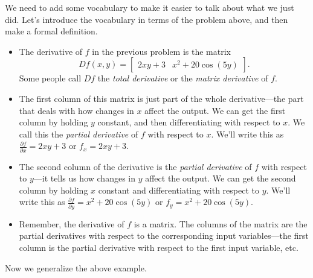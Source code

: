 We need to add some vocabulary to make it easier to talk about what we just did. Let's introduce the vocabulary in terms of the problem above, and then make a formal definition.
\begin{itemize}
 \item The derivative of $f$ in the previous problem is the matrix 
 $$Df(x,y) = \begin{bmatrix}
  2xy+3& 
  x^2+20\cos(5y)
 \end{bmatrix}.$$ 
 Some people call $Df$ the \emph{total derivative} or the \emph{matrix derivative} of $f$.
 \item The first column of this matrix is just part of the whole derivative---the part that deals with how changes in $x$ affect the output. We can get the first column by holding $y$ constant, and then differentiating with respect to $x$.  We call this the \emph{partial derivative} of $f$ with respect to $x$.  We'll write this as $\frac{\partial f}{\partial x} = 2xy+3$ or $f_x = 2xy+3$.
 \item The second column of the derivative is the \emph{partial derivative} of $f$ with respect to $y$---it tells us how changes in $y$ affect the output. We can get the second column by holding $x$ constant and differentiating with respect to $y$. We'll write this as $\frac{\partial f}{\partial y} =   x^2+20\cos(5y) $ or $f_y =   x^2+20\cos(5y)$.
 \item Remember, the derivative of $f$ is a matrix. The columns of the matrix are the partial derivatives with respect to the corresponding input variables---the first column is the partial derivative with respect to the first input variable, etc. 
\end{itemize}

Now we generalize the above example.

